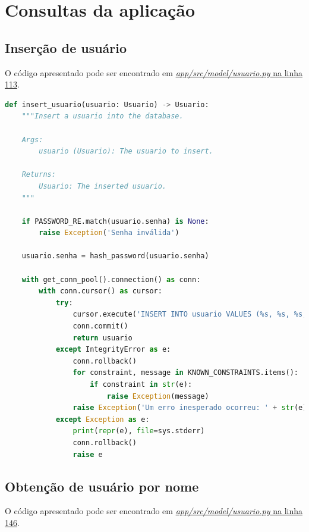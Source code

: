 \section{Consultas da aplicação}


\subsection{Inserção de usuário}

O código apresentado pode ser encontrado em \href{}{\textit{app/src/model/usuario.py} na linha 113}.

\begin{lstlisting}[language=Python,caption={Inserção de usuário},label={lst:insercao_usuario}]
  def insert_usuario(usuario: Usuario) -> Usuario:
    """Insert a usuario into the database.

    Args:
        usuario (Usuario): The usuario to insert.

    Returns:
        Usuario: The inserted usuario.
    """
    
    if PASSWORD_RE.match(usuario.senha) is None:
        raise Exception('Senha inválida')
    
    usuario.senha = hash_password(usuario.senha)
    
    with get_conn_pool().connection() as conn:
        with conn.cursor() as cursor: 
            try:
                cursor.execute('INSERT INTO usuario VALUES (%s, %s, %s, %s);', usuario.to_tuple())
                conn.commit()
                return usuario
            except IntegrityError as e:
                conn.rollback()
                for constraint, message in KNOWN_CONSTRAINTS.items():
                    if constraint in str(e):
                        raise Exception(message)
                raise Exception('Um erro inesperado ocorreu: ' + str(e))
            except Exception as e:
                print(repr(e), file=sys.stderr)
                conn.rollback()
                raise e
\end{lstlisting}

\subsection{Obtenção de usuário por nome}

O código apresentado pode ser encontrado em \href{}{\textit{app/src/model/usuario.py} na linha 146}.

